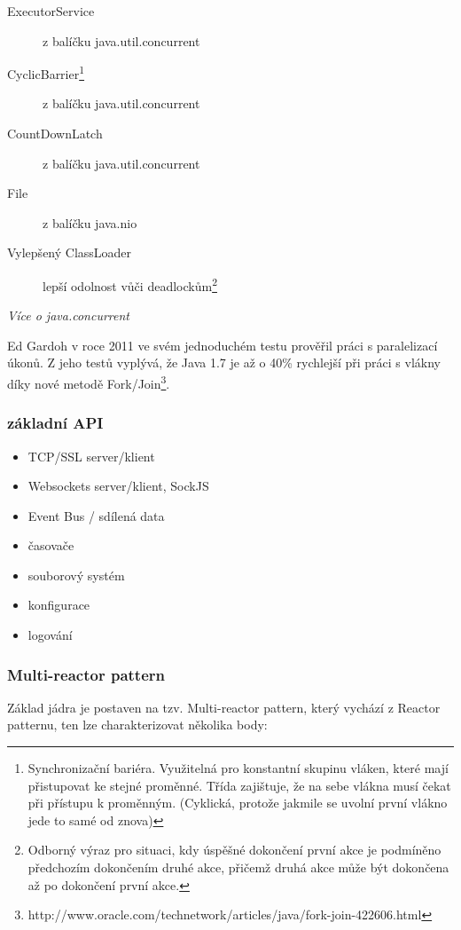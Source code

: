 \begin{description}
\item[ExecutorService]{z balíčku java.util.concurrent}
\item[CyclicBarrier\footnote{Synchronizační bariéra. Využitelná pro konstantní skupinu vláken, které mají přistupovat ke stejné proměnné. Třída zajištuje, že na sebe vlákna musí čekat při přístupu k proměnným. (Cyklická, protože jakmile se uvolní první vlákno jede to samé od znova)}]{z balíčku java.util.concurrent}
\item[CountDownLatch]{z balíčku java.util.concurrent}
\item[File]{z balíčku java.nio}
\item[Vylepšený ClassLoader]{lepší odolnost vůči deadlockům\footnote{ Odborný výraz pro situaci, kdy úspěšné dokončení první akce je podmíněno předchozím dokončením druhé akce, přičemž druhá akce může být dokončena až po dokončení první akce.}}
\end{description}
\emph{Více o java.concurrent\cite{javaChangelog}}

Ed Gardoh v roce 2011 ve svém jednoduchém testu\cite{serialTest} prověřil práci s paralelizací úkonů. Z jeho testů vyplývá, že Java 1.7 je až o 40\% rychlejší při práci s vlákny díky nové metodě Fork/Join\footnote{http://www.oracle.com/technetwork/articles/java/fork-join-422606.html}.

\subsubsection{základní API}\label{sub:coreAPI}

\begin{itemize}
\item{TCP/SSL server/klient}
\item{Websockets server/klient, SockJS}
\item{Event Bus / sdílená data}
\item{časovače}
\item{souborový systém}
\item{konfigurace}
\item{logování}
\end{itemize}

\subsubsection{Multi-reactor pattern}

Základ jádra je postaven na tzv. Multi-reactor pattern\cite{eventLoops}, který vychází z Reactor patternu\cite{reactorPattern}, ten lze charakterizovat několika body:

